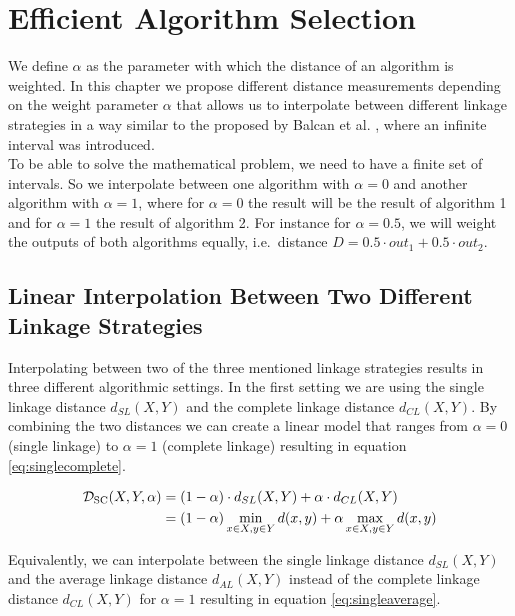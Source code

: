 \chapter{Efficient Algorithm Selection}
\label{chapter:alphalinkage}

We define $\alpha$ as the parameter with which the distance of an algorithm is weighted. In this chapter we propose different distance measurements depending on the weight parameter $\alpha$ that allows us to interpolate between different linkage strategies in a way similar to the proposed by Balcan et al. \cite{DBLP:journals/corr/BalcanNVW16}, where an infinite interval was introduced.\\

To be able to solve the mathematical problem, we need to have a finite set of intervals. So we interpolate between one algorithm with $\alpha = 0$ and another algorithm with $\alpha = 1$, where for $\alpha = 0$ the result will be the result of algorithm 1 and for $\alpha = 1$ the result of algorithm 2. For instance for $\alpha = 0.5$, we will weight the outputs of both algorithms equally, i.e.\ distance $D = 0.5 \cdot out_1 + 0.5 \cdot out_2$.

\section{Linear Interpolation Between Two Different Linkage Strategies}

Interpolating between two of the three mentioned linkage strategies results in three different algorithmic settings. In the first setting we are using the single linkage distance $d_{SL}(X,Y)$ and the complete linkage distance $d_{CL}(X,Y)$. By combining the two distances we can create a linear model that ranges from $\alpha = 0$ (single linkage) to $\alpha = 1$ (complete linkage) resulting in equation \ref{eq:singlecomplete}.

\begin{equation}
    \begin{aligned}
        \mathcal{D}_\text{SC}(X,Y,\alpha) &= (1 - \alpha) \cdot d_{SL}(X,Y) + \alpha \cdot d_{CL}(X,Y)\\
        &= (1 - \alpha) \min\limits_{x \in X, y \in Y} d(x,y) + \alpha \max\limits_{x \in X, y \in Y} d(x,y)
    \end{aligned}
    \label{eq:singlecomplete}
\end{equation}

Equivalently, we can interpolate between the single linkage distance $d_{SL}(X,Y)$ and the average linkage distance $d_{AL}(X,Y)$ instead of the complete linkage distance $d_{CL}(X,Y)$ for $\alpha = 1$ resulting in equation \ref{eq:singleaverage}. 

